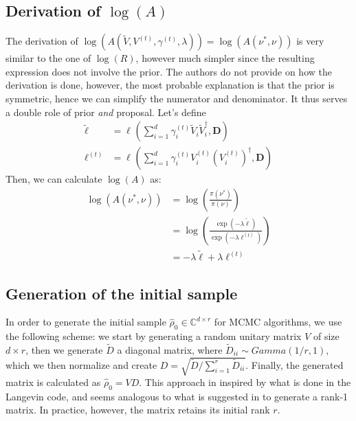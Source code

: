 \documentclass[12pt]{memoir}
\newcommand{\mb}{\mathbf}
\begin{document}
\subsection*{Derivation of $\log(A)$}
The derivation of $\log(A(\tilde V, V^{(t)}, \gamma^{(t)}, \lambda)) = \log(A(\nu^*, \nu))$ is very similar to the one of $\log(R)$, however much simpler since the resulting expression does not involve the prior. The authors do not provide on how the derivation is done, however, the most probable explanation is that the prior is symmetric, hence we can simplify the numerator and denominator. It thus serves a double role of prior \textit{and} proposal. Let's define
\begin{align}
    \tilde \ell &= \ell^{}(\sum_{i=1}^{d} \gamma_i^{(t)} \tilde V_i \tilde V_i^\dagger, \mb D)\\
    \ell^{(t)} &= \ell^{}(\sum_{i=1}^{d} \gamma_i^{(t)} V_i^{(t)} (V_i^{(t)})^\dagger, \mb D)
\end{align}
Then, we can calculate $\log(A)$ as:
\begin{align}
    \log(A(\nu^*, \nu)) &= \log(\frac{\pi(\nu^*)} {\pi(\nu) })\\
                        &= \log(\frac{\exp(-\lambda \tilde \ell)}{\exp(-\lambda \ell^{(t)})})\\
                        &= -\lambda \tilde \ell + \lambda \ell^{(t)}
\end{align}

\subsection*{Generation of the initial sample}\label{section:init-sample-gen}
In order to generate the initial sample $\hat \rho_0 \in \mathbb{C}^{d\times r}$ for MCMC algorithms, we use the following scheme: we start by generating a random unitary matrix $V$ of size $d \times r$, then we generate $\tilde D$ a diagonal matrix, where $\tilde D_{ii} \sim Gamma(1/r, 1)$, which we then normalize and create $D = \sqrt{\tilde D/\sum_{i=1}^{r} \tilde D_{ii}}$. Finally, the generated matrix is calculated as $\hat \rho_0 = V D$. This approach in inspired by what is done in the Langevin code, and seems analogous to what is suggested in \cite{MA17} to generate a rank-1 matrix. In practice, however, the matrix retains its initial rank $r$.

\end{document}
